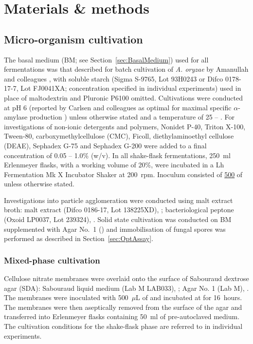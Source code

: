 \section{Materials \& methods}

\subsection{Micro-organism cultivation}

The basal medium (BM; see Section~\ref{sec:BasalMedium}) used for all fermentations was that described for batch cultivation of \emph{A. oryzae} by Amanullah and colleagues \cite{amanullah2000}, with soluble starch (Sigma S-9765, Lot 93H0243 or Difco 0178-17-7, Lot FJ0041XA; concentration specified in individual experiments) used in place of maltodextrin and Pluronic P6100 omitted. Cultivations were conducted at pH 6 (reported by Carlsen and colleagues as optimal for maximal specific $\alpha$-amylase production \cite{carlsen1996a}) unless otherwise stated and a temperature of 25 -- . For investigations of non-ionic detergents and polymers, Nonidet P-40, Triton X-100, Tween-80, carboxymethylcellulose (CMC), Ficoll, diethylaminoethyl cellulose (DEAE), Sephadex G-75 and Sephadex G-200 were added to a final concentration of 0.05 -- 1.0\% (w/v). In all shake-flask fermentations, 250~ml Erlenmeyer flasks, with a working volume of 20\%, were incubated in a Lh Fermentation Mk X Incubator Shaker at 200~rpm. Inoculum consisted of \ul{500} of  unless otherwise stated.

Investigations into particle agglomeration were conducted using malt extract broth: malt extract (Difco 0186-17, Lot 138225XD), ; bacteriological peptone (Oxoid LP0037, Lot 239324), . Solid state cultivation was conducted on BM supplemented with Agar No.~1 () and immobilisation of fungal spores was performed as described in Section~\ref{sec:OptAssay}.

\subsubsection{Mixed-phase cultivation}

Cellulose nitrate membranes were overlaid onto the surface of Sabouraud dextrose agar (SDA): Sabouraud liquid medium (Lab M LAB033), ; Agar No. 1 (Lab M), . The membranes were inoculated with 500~$\mu$L of  and incubated at  for 16~hours. The membranes were then aseptically removed from the surface of the agar and transferred into Erlenmeyer flasks containing 50~ml of pre-autoclaved medium. The cultivation conditions for the shake-flask phase are referred to in individual experiments.


